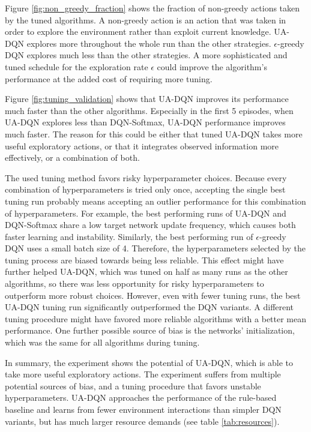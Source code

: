Figure \ref{fig:non_greedy_fraction} shows the fraction of non-greedy actions taken by the tuned algorithms.
A non-greedy action is an action that was taken in order to explore the environment rather than exploit current knowledge.
UA-DQN explores more throughout the whole run than the other strategies.
$\epsilon$-greedy DQN explores much less than the other strategies.
A more sophisticated and tuned schedule for the exploration rate $\epsilon$ could improve the algorithm's performance at the added cost of requiring more tuning.

Figure \ref{fig:tuning_validation} shows that UA-DQN improves its performance much faster than the other algorithms.
Especially in the first 5 episodes, when UA-DQN explores less than DQN-Softmax, UA-DQN performance improves much faster.
The reason for this could be either that tuned UA-DQN takes more useful exploratory actions, or that it integrates observed information more effectively, or a combination of both.

The used tuning method favors risky hyperparameter choices.
Because every combination of hyperparameters is tried only once, accepting the single best tuning run probably means accepting an outlier performance for this combination of hyperparameters.
For example, the best performing runs of UA-DQN and DQN-Softmax share a low target network update frequency, which causes both faster learning and instability. Similarly, the best performing run of $\epsilon$-greedy DQN uses a small batch size of 4.
Therefore, the hyperparameters selected by the tuning process are biased towards being less reliable.
This effect might have further helped UA-DQN, which was tuned on half as many runs as the other algorithms, so there was less opportunity for risky hyperparameters to outperform more robust choices.
However, even with fewer tuning runs, the best UA-DQN tuning run significantly outperformed the DQN variants.
A different tuning procedure might have favored more reliable algorithms with a better mean performance.
One further possible source of bias is the networks' initialization, which was the same for all algorithms during tuning.

In summary, the experiment shows the potential of UA-DQN, which is able to take more useful exploratory actions.
The experiment suffers from multiple potential sources of bias, and a tuning procedure that favors unstable hyperparameters.
UA-DQN approaches the performance of the rule-based baseline and learns from fewer environment interactions than simpler DQN variants, but has much larger resource demands (see table \ref{tab:resources}).


